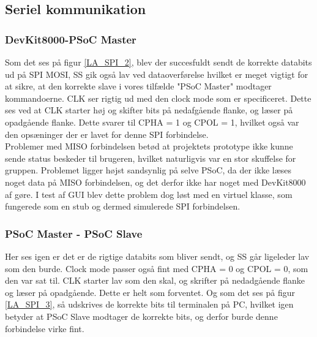 \subsection{Seriel kommunikation}
\subsubsection{DevKit8000-PSoC Master}

Som det ses på figur \ref{LA_SPI_2}, blev der succesfuldt sendt de korrekte databits ud på SPI MOSI, SS gik også lav ved dataoverførelse hvilket er meget vigtigt
for at sikre, at den korrekte slave i vores tilfælde "PSoC Master" modtager kommandoerne. CLK ser rigtig ud med den clock mode som er specificeret.
Dette ses ved at CLK starter høj og skifter bits på nedafgående flanke, og læser på opadgående flanke. Dette svarer til CPHA = 1 og CPOL = 1, hvilket også var 
den opsæninger der er lavet for denne SPI forbindelse.\\

Problemer med MISO forbindelsen betød at projektets prototype ikke kunne sende status beskeder til brugeren, hvilket naturligvis var en stor skuffelse for
gruppen. Problemet ligger højst sandsynlig på selve PSoC, da der ikke læses noget data på MISO forbindelsen, og det derfor ikke har noget med DevKit8000 af gøre.
I test af GUI blev dette problem dog løst med en virtuel klasse, som fungerede som en stub og dermed simulerede SPI forbindelsen.


\subsubsection{PSoC Master - PSoC Slave}

Her ses igen er det er de rigtige databits som bliver sendt, og SS går ligeleder lav som den burde. Clock mode passer også fint med 
CPHA = 0 og CPOL = 0, som den var sat til. CLK starter lav som den skal, og skrifter på nedadgående flanke og læser på opadgående. Dette er helt som forventet. 
Og som det ses på figur \ref{LA_SPI_3}, så udskrives de korrekte bits til terminalen på PC, hvilket igen betyder at PSoC Slave modtager de korrekte bits, 
og derfor burde denne forbindelse virke fint.